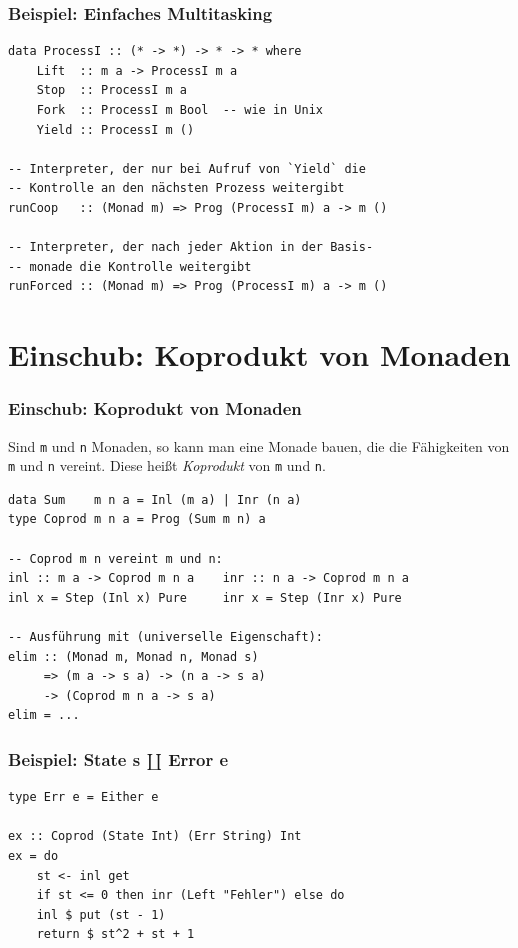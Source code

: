 \documentclass[12pt,compress,ngerman,utf8,t]{beamer}
\begin{document}
\begin{frame}[fragile]\frametitle{Beispiel: Einfaches Multitasking}
  \begin{verbatim}
data ProcessI :: (* -> *) -> * -> * where
    Lift  :: m a -> ProcessI m a
    Stop  :: ProcessI m a
    Fork  :: ProcessI m Bool  -- wie in Unix
    Yield :: ProcessI m ()

-- Interpreter, der nur bei Aufruf von `Yield` die
-- Kontrolle an den nächsten Prozess weitergibt
runCoop   :: (Monad m) => Prog (ProcessI m) a -> m ()

-- Interpreter, der nach jeder Aktion in der Basis-
-- monade die Kontrolle weitergibt
runForced :: (Monad m) => Prog (ProcessI m) a -> m ()
  \end{verbatim}
\end{frame}



\section{Einschub: Koprodukt von Monaden}

\begin{frame}[fragile]\frametitle{Einschub: Koprodukt von Monaden}
  Sind \texttt{m} und \texttt{n} Monaden, so kann man eine Monade bauen, die
  die Fähigkeiten von \texttt{m} und \texttt{n} vereint. Diese heißt
  \emph{Koprodukt} von \texttt{m} und \texttt{n}.
  \medskip

  \small
  \begin{verbatim}
data Sum    m n a = Inl (m a) | Inr (n a)
type Coprod m n a = Prog (Sum m n) a

-- Coprod m n vereint m und n:
inl :: m a -> Coprod m n a    inr :: n a -> Coprod m n a
inl x = Step (Inl x) Pure     inr x = Step (Inr x) Pure

-- Ausführung mit (universelle Eigenschaft):
elim :: (Monad m, Monad n, Monad s)
     => (m a -> s a) -> (n a -> s a)
     -> (Coprod m n a -> s a)
elim = ...
  \end{verbatim}
\end{frame}

\begin{frame}[fragile]\frametitle{Beispiel: State s $\amalg$ Error e}
  \begin{verbatim}
type Err e = Either e

ex :: Coprod (State Int) (Err String) Int
ex = do
    st <- inl get
    if st <= 0 then inr (Left "Fehler") else do
    inl $ put (st - 1)
    return $ st^2 + st + 1
  \end{verbatim}
\end{frame}
\end{document}
